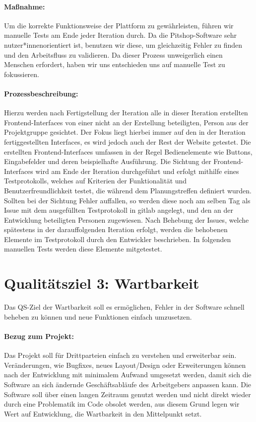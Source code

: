 \documentclass[
ngerman,
accentcolor=2d,
marginpar=false,
class=report,
fontsize=11pt,
ruledheaders=section,
]{tudapub}
\begin{document}
            \paragraph{Maßnahme:}
            Um die korrekte Funktionsweise der Plattform zu gewährleisten, führen wir manuelle Tests am Ende jeder Iteration durch.
            Da die Pitshop-Software sehr nutzer*innenorientiert ist, benutzen wir diese, um gleichzeitig Fehler zu finden und den Arbeitsfluss zu validieren.
            Da dieser Prozess unweigerlich einen Menschen erfordert, haben wir uns entschieden uns auf manuelle Test zu fokussieren.

            \paragraph{Prozessbeschreibung:}
            Hierzu werden nach Fertigstellung der Iteration alle in dieser Iteration erstellten Frontend-Interfaces von einer nicht an der Erstellung beteiligten,
            Person aus der Projektgruppe gesichtet. Der Fokus liegt hierbei immer auf den in der Iteration fertiggestellten Interfaces, es wird jedoch auch der Rest der Website getestet. Die erstellten Frontend-Interfaces umfassen in der Regel Bedienelemente wie Buttons, Eingabefelder und deren beispielhafte Ausführung. Die Sichtung der Frontend-Interfaces wird am Ende der Iteration durchgeführt
            und erfolgt mithilfe eines Testprotokolls, welches auf Kriterien der Funktionalität und Benutzerfreundlichkeit testet, die während dem
            Planungstreffen definiert wurden. Sollten bei der Sichtung Fehler auffallen, so werden diese noch am selben
            Tag als Issue mit dem ausgefüllten Testprotokoll in gitlab angelegt, und den an der Entwicklung beteiligten Personen zugewiesen. Nach Behebung der Issues, welche spätestens in der darauffolgenden
            Iteration erfolgt, werden die behobenen Elemente im Testprotokoll durch den Entwickler beschrieben. In folgenden manuellen Tests werden diese Elemente mitgetestet.


		\section{Qualitätsziel 3: Wartbarkeit}
		    Das QS-Ziel der Wartbarkeit soll es ermöglichen, Fehler in der Software schnell beheben zu können und neue Funktionen einfach umzusetzen.

	        \paragraph{Bezug zum Projekt:}
	        Das Projekt soll für Drittparteien einfach zu verstehen und erweiterbar sein. Veränderungen, wie Bugfixes, neues Layout/Design oder Erweiterungen können nach der Entwicklung mit minimalem Aufwand umgesetzt werden, damit sich die Software an sich ändernde Geschäftsabläufe des Arbeitgebers anpassen kann. Die Software soll über einen langen Zeitraum genutzt werden und nicht direkt wieder durch eine Problematik im Code obsolet werden, aus diesem Grund legen wir Wert auf Entwicklung, die Wartbarkeit in den Mittelpunkt setzt.
\end{document}
